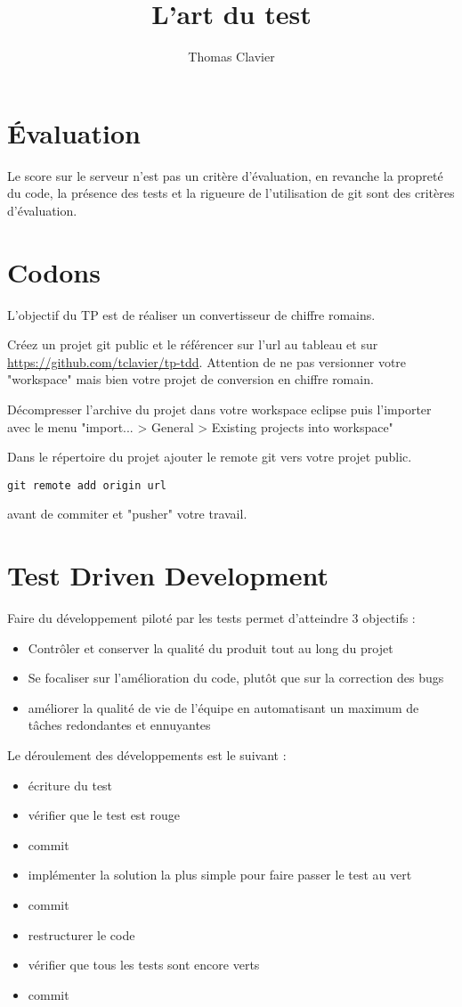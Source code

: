 \documentclass[a4paper]{article}
\title{L'art du test}
\author{Thomas Clavier}
\date{}
\begin{document}
\maketitle

\section*{Évaluation}
Le score sur le serveur n'est pas un critère d'évaluation, en revanche la propreté du code, la présence des tests et la rigueure de l'utilisation de git sont des critères d'évaluation.

\section*{Codons}
L’objectif du TP est de réaliser un convertisseur de chiffre romains.

Créez un projet git public et le référencer sur l'url au tableau et sur \url{https://github.com/tclavier/tp-tdd}. Attention de ne pas versionner votre "workspace" mais bien votre projet de conversion en chiffre romain.

Décompresser l’archive du projet dans votre workspace eclipse puis l’importer avec le menu "import... > General > Existing projects into workspace"

Dans le répertoire du projet ajouter le remote git vers votre projet public.
\begin{verbatim}
git remote add origin url
\end{verbatim}
avant de commiter et "pusher" votre travail.

\section*{Test Driven Development}

Faire du développement piloté par les tests permet d'atteindre 3 objectifs :

\begin{itemize}
\item Contrôler et conserver la qualité du produit tout au long du projet
\item Se focaliser sur l'amélioration du code, plutôt que sur la correction des bugs
\item améliorer la qualité de vie de l'équipe en automatisant un maximum de tâches redondantes et ennuyantes
\end{itemize}

Le déroulement des développements est le suivant :
\begin{itemize}
  \item écriture du test
  \item vérifier que le test est rouge
  \item commit
  \item implémenter la solution la plus simple pour faire passer le test au vert
  \item commit
  \item restructurer le code
  \item vérifier que tous les tests sont encore verts
  \item commit 
\end{itemize}
\end{document}
